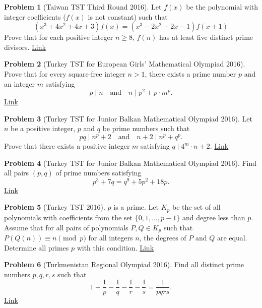 \documentclass[]{article}
\theoremstyle{definition}
\newtheorem{problem}{Problem}
\begin{document}
\begin{problem}[Taiwan TST Third Round 2016]
	Let $f(x)$ be the polynomial with integer coefficients ($f(x)$ is not constant) such that
	\[(x^3+4x^2+4x+3)f(x)=(x^3-2x^2+2x-1)f(x+1)\]Prove that for each positive integer $n\geq8$, $f(n)$ has at least five distinct prime divisors. \hfill \href{http://artofproblemsolving.com/community/c6h1278533p6716098}{Link}
\end{problem}

\begin{problem}[Turkey TST for European Girls' Mathematical Olympiad 2016]
	Prove that for every square-free integer $n>1$, there exists a prime number $p$ and an integer $m$ satisfying
	\[ p \mid n \quad \text{and} \quad n \mid p^2+p\cdot m^p. \]
	\flushright \href{http://artofproblemsolving.com/community/c6h1248658p6420003}{Link}
\end{problem}



\begin{problem}[Turkey TST for Junior Balkan Mathematical Olympiad 2016]
	Let $n$ be a positive integer, $p$ and $q$ be prime numbers such that
	\[ pq \mid n^p+2 \quad \text{and} \quad n+2 \mid n^p+q^p. \] Prove that there exists a positive integer $m$ satisfying $q \mid 4^m \cdot n +2$. \hfill \href{http://artofproblemsolving.com/community/c6h1246256p6393813}{Link}
\end{problem}



\begin{problem}[Turkey TST for Junior Balkan Mathematical Olympiad 2016]
	Find all pairs $(p, q)$ of prime numbers satisfying
	\[ p^3+7q=q^9+5p^2+18p. \]
	\flushright \href{http://artofproblemsolving.com/community/c6h1246266p6393971}{Link}
\end{problem}



\begin{problem}[Turkey TST 2016]
	$p$ is a prime. Let $K_p$ be the set of all polynomials with coefficients from the set $\{0,1,\dots ,p-1\}$ and degree less than $p$. Assume that for all pairs of polynomials $P,Q\in K_p$ such that $P(Q(n))\equiv n\pmod p$ for all integers $n$, the degrees of $P$ and $Q$ are equal. Determine all primes $p$ with this condition. \hfill \href{http://artofproblemsolving.com/community/c6h1225651p6159696}{Link}
\end{problem}




\begin{problem}[Turkmenistan Regional Olympiad 2016]
	Find all distinct prime numbers $p,q,r,s$ such that $$1-\frac{1}{p} - \frac{1}{q} -\frac{1}{r} - \frac{1}{s} =\frac{1}{pqrs}.$$
	\flushright \href{http://artofproblemsolving.com/community/c6h1202195p5915235}{Link}
\end{problem}
\end{document}
